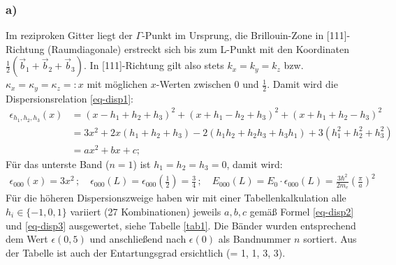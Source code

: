 \subsubsection*{a)}
Im reziproken Gitter liegt der $\Gamma$-Punkt im Ursprung, die Brillouin-Zone
in [111]-Richtung (Raumdiagonale) erstreckt sich bis zum L-Punkt mit den
Koordinaten $\frac{1}{2} (\vec b_1 + \vec b_2 + \vec b_3)$. In [111]-Richtung
gilt also stets $k_x = k_y = k_z$ bzw. $\kappa_x = \kappa_y = \kappa_z =: x$
mit möglichen $x$-Werten zwischen 0 und $\frac{1}{2}$.
Damit wird die Dispersionsrelation \eqref{eq-disp1}:
\begin{align}
\nonumber
\epsilon_{h_1, h_2, h_3}(x) &= (x-h_1+h_2+h_3 )^2 + (x+h_1-h_2+h_3 )^2 + (x+h_1+h_2-h_3 )^2 \\
\label{eq-disp2}
& = 3 x^2 + 2 x (h_1+h_2+h_3) -2 (h_1 h_2 + h_2 h_3 + h_3 h_1) + 3 (h_1^2 + h_2^2 + h_3^2)\\
\label{eq-disp3}
& = a x^2 + b x + c;
\end{align}
Für das unterste Band ($n = 1$) ist $h_1 =  h_2 =  h_3 = 0$, damit wird:
\begin{align*}
  \epsilon_{000}(x) = 3 x^2 \,;\quad
  \epsilon_{000}(L) = \epsilon_{000}\left(\frac{1}{2}\right) = \frac{3}{4} \,;\quad
  E_{000}(L) = E_0 \cdot \epsilon_{000}(L) = \frac{3 \hbar^2}{2 m_e} \left(\frac{\pi}{a}\right)^2
\end{align*}
Für die höheren Dispersionszweige haben wir mit einer Tabellenkalkulation alle
$h_i \in \{-1, 0, 1\}$ variiert (27 Kombinationen) jeweils $a, b, c$ gemäß Formel
\eqref{eq-disp2} und \eqref{eq-disp3} ausgewertet, siehe Tabelle \ref{tab1}.
Die Bänder wurden entsprechend dem Wert $\epsilon(0,5)$ und anschließend nach
$\epsilon(0)$ als Bandnummer $n$ sortiert. Aus der Tabelle ist auch der
Entartungsgrad ersichtlich (= 1, 1, 3, 3).
